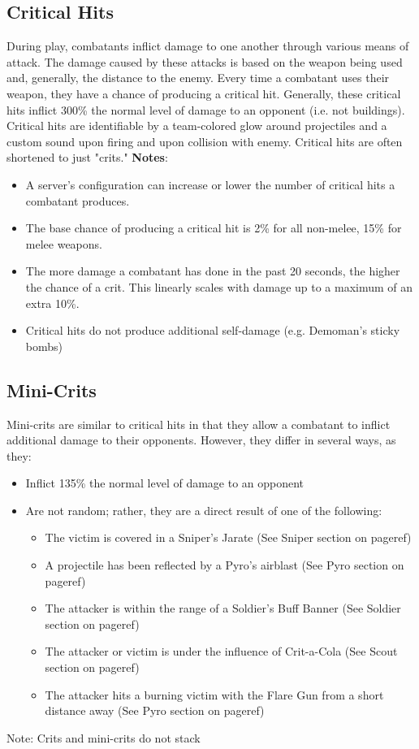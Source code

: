 \subsection{Critical Hits}
During play, combatants inflict damage to one another through various means of attack.  The damage caused by these attacks is based on the weapon being used and, generally, the distance to the enemy.  Every time a combatant uses their weapon, they have a chance of producing a critical hit.  Generally, these critical hits inflict 300\% the normal level of damage to an opponent (i.e. not buildings). Critical hits are identifiable by a team-colored glow around projectiles and a custom sound upon firing and upon collision with enemy.  Critical hits are often shortened to just "crits."
\newpage
{\bf Notes}:
\begin{itemize}
	\item A server's configuration can increase or lower the number of critical hits a combatant produces. 
	\item The base chance of producing a critical hit is 2\% for all non-melee, 15\% for melee weapons.
	\item The more damage a combatant has done in the past 20 seconds, the higher the chance of a crit. This linearly scales with damage up to a maximum of an extra 10\%. 
	\item Critical hits do not produce additional self-damage (e.g. Demoman's sticky bombs)
\end{itemize}

\subsection{Mini-Crits}
Mini-crits are similar to critical hits in that they allow a combatant to inflict additional damage to their opponents.  However, they differ in several ways, as they:
\begin{itemize}
	\item Inflict 135\% the normal level of damage to an opponent
	\item Are not random; rather, they are a direct result of one of the following:
		\begin{itemize}
			\item The victim is covered in a Sniper's Jarate (See Sniper section on {{pageref}})
			\item A projectile has been reflected by a Pyro's airblast (See Pyro section on {{pageref}})
			\item The attacker is within the range of a Soldier's Buff Banner (See Soldier section on {{pageref}})
			\item The attacker or victim is under the influence of Crit-a-Cola (See Scout section on {{pageref}})
			\item The attacker hits a burning victim with the Flare Gun from a short distance away (See Pyro section on {{pageref}})
		\end{itemize}
\end{itemize}
Note: Crits and mini-crits do not stack


